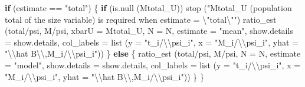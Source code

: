 \documentclass[
  letterpaper,
  DIV=11,
  numbers=noendperiod]{scrreprt}
\newenvironment{Shaded}{\begin{snugshade}}{\end{snugshade}}
\newcommand{\AttributeTok}[1]{\textcolor[rgb]{0.40,0.45,0.13}{#1}}
\newcommand{\ControlFlowTok}[1]{\textcolor[rgb]{0.00,0.23,0.31}{\textbf{#1}}}
\newcommand{\FunctionTok}[1]{\textcolor[rgb]{0.28,0.35,0.67}{#1}}
\newcommand{\NormalTok}[1]{\textcolor[rgb]{0.00,0.23,0.31}{#1}}
\newcommand{\SpecialCharTok}[1]{\textcolor[rgb]{0.37,0.37,0.37}{#1}}
\newcommand{\StringTok}[1]{\textcolor[rgb]{0.13,0.47,0.30}{#1}}
\renewcommand{\[}{\begin{equation}}
\renewcommand{\]}{\end{equation}}
\begin{document}
\begin{Shaded}
\begin{Highlighting}[]
  \ControlFlowTok{if}\NormalTok{ (estimate }\SpecialCharTok{==} \StringTok{"total"}\NormalTok{)}
\NormalTok{  \{}
      \ControlFlowTok{if}\NormalTok{ (}\FunctionTok{is.null}\NormalTok{ (Mtotal\_U))}
          \FunctionTok{stop}\NormalTok{ (}\StringTok{"Mtotal\_U (population total of the size variable) is required when estimate = }\SpecialCharTok{\textbackslash{}"}\StringTok{total}\SpecialCharTok{\textbackslash{}"}\StringTok{"}\NormalTok{)}
      \FunctionTok{ratio\_est}\NormalTok{ (total}\SpecialCharTok{/}\NormalTok{psi, M}\SpecialCharTok{/}\NormalTok{psi, }\AttributeTok{xbarU =}\NormalTok{ Mtotal\_U, }\AttributeTok{N =}\NormalTok{ N, }\AttributeTok{estimate =} \StringTok{"mean"}\NormalTok{, }\AttributeTok{show.details =}\NormalTok{ show.details,}
                 \AttributeTok{col\_labels =} \FunctionTok{list}\NormalTok{ (}\AttributeTok{y =} \StringTok{"t\_i/}\SpecialCharTok{\textbackslash{}\textbackslash{}}\StringTok{psi\_i"}\NormalTok{, }\AttributeTok{x =} \StringTok{"M\_i/}\SpecialCharTok{\textbackslash{}\textbackslash{}}\StringTok{psi\_i"}\NormalTok{, }\AttributeTok{yhat =} \StringTok{"}\SpecialCharTok{\textbackslash{}\textbackslash{}}\StringTok{hat B}\SpecialCharTok{\textbackslash{}\textbackslash{}}\StringTok{,M\_i/}\SpecialCharTok{\textbackslash{}\textbackslash{}}\StringTok{psi\_i"}\NormalTok{))}
\NormalTok{  \}}
  \ControlFlowTok{else}
\NormalTok{  \{}
      \FunctionTok{ratio\_est}\NormalTok{ (total}\SpecialCharTok{/}\NormalTok{psi, M}\SpecialCharTok{/}\NormalTok{psi, }\AttributeTok{N =}\NormalTok{ N, }\AttributeTok{estimate =} \StringTok{"model"}\NormalTok{, }\AttributeTok{show.details =}\NormalTok{ show.details,}
                 \AttributeTok{col\_labels =} \FunctionTok{list}\NormalTok{ (}\AttributeTok{y =} \StringTok{"t\_i/}\SpecialCharTok{\textbackslash{}\textbackslash{}}\StringTok{psi\_i"}\NormalTok{, }\AttributeTok{x =} \StringTok{"M\_i/}\SpecialCharTok{\textbackslash{}\textbackslash{}}\StringTok{psi\_i"}\NormalTok{, }\AttributeTok{yhat =} \StringTok{"}\SpecialCharTok{\textbackslash{}\textbackslash{}}\StringTok{hat B}\SpecialCharTok{\textbackslash{}\textbackslash{}}\StringTok{,M\_i/}\SpecialCharTok{\textbackslash{}\textbackslash{}}\StringTok{psi\_i"}\NormalTok{))}
\NormalTok{  \}}
\NormalTok{\}}


\end{Highlighting}
\end{Shaded}
\end{document}
